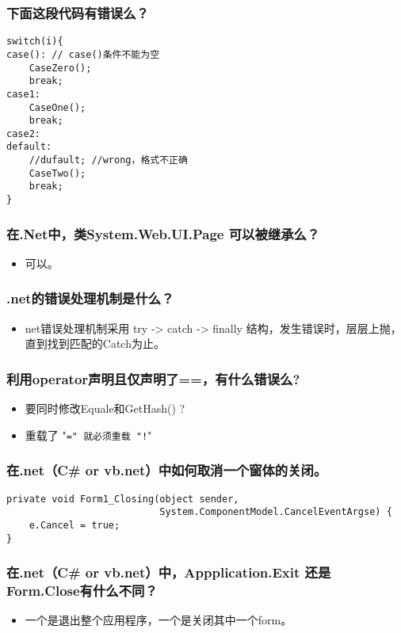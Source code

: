 \documentclass[9pt, b5paper]{article}
\begin{document}
\subsubsection{下面这段代码有错误么？}
\label{sec-1-1-89}
\begin{verbatim}
switch(i){
case(): // case()条件不能为空
    CaseZero();
    break;
case1:
    CaseOne();
    break;
case2:
default:
    //dufault; //wrong，格式不正确
    CaseTwo();
    break;
}
\end{verbatim}
\subsubsection{在.Net中，类System.Web.UI.Page 可以被继承么？}
\label{sec-1-1-90}
\begin{itemize}
\item 可以。
\end{itemize}
\subsubsection{.net的错误处理机制是什么？}
\label{sec-1-1-91}
\begin{itemize}
\item net错误处理机制采用 try -> catch -> finally 结构，发生错误时，层层上抛，直到找到匹配的Catch为止。
\end{itemize}
\subsubsection{利用operator声明且仅声明了==，有什么错误么?}
\label{sec-1-1-92}
\begin{itemize}
\item 要同时修改Equale和GetHash() ?
\item 重载了 "\texttt{=" 就必须重载 "!}"
\end{itemize}
\subsubsection{在.net（C\# or vb.net）中如何取消一个窗体的关闭。}
\label{sec-1-1-93}
\begin{verbatim}
private void Form1_Closing(object sender,
                           System.ComponentModel.CancelEventArgse) {
    e.Cancel = true;
}
\end{verbatim}
\subsubsection{在.net（C\# or vb.net）中，Appplication.Exit 还是 Form.Close有什么不同？}
\label{sec-1-1-94}
\begin{itemize}
\item 一个是退出整个应用程序，一个是关闭其中一个form。
\end{itemize}
\end{document}
